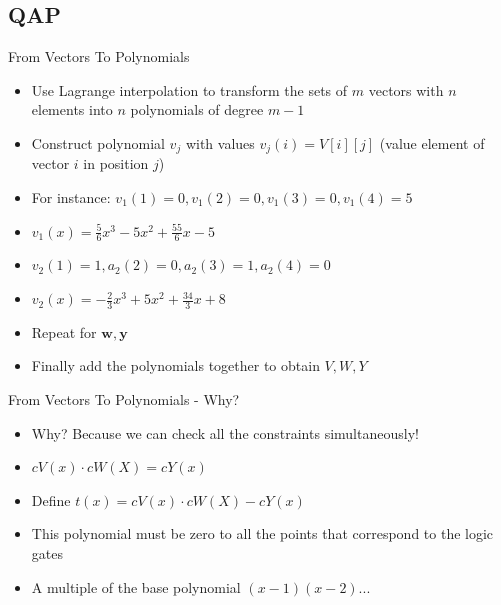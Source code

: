 \documentclass[handouts]{beamer}
\begin{document}
\subsection{QAP}
\begin{frame}{From Vectors To Polynomials}
    \begin{itemize}
        \item Use Lagrange interpolation to transform the sets of $m$ vectors with $n$ elements into $n$ polynomials of degree $m-1$ \pause
        \item Construct polynomial $v_j$ with values $v_j(i) =V[i][j]$ (value element of vector $i$ in position $j$) \pause
        \item For instance: $v_1(1) = 0, v_1(2) = 0, v_1(3)=0, v_1(4) = 5$ \pause
        \item $v_1(x) = \frac{5}{6}x^3-5x^2+\frac{55}{6}x-5$ \pause
        \item $v_2(1) = 1, a_2(2) = 0, a_2(3)=1, a_2(4) = 0$ \pause
        \item $v_2(x) = -\frac{2}{3}x^3+5x^2+\frac{34}{3}x+8$ \pause
        \item Repeat for $\bm{w}, \bm{y}$ \pause
        \item Finally add the polynomials together to obtain $V,W,Y$ \pause
    \end{itemize}
\end{frame}

\begin{frame}{From Vectors To Polynomials - Why?}
\begin{itemize}
    \item Why? Because we can check all the constraints simultaneously! \pause
    \item $cV(x) \cdot cW(X) = cY(x)$ \pause
    \item Define $t(x) = cV(x) \cdot cW(X) - cY(x)$ \pause
    \item This polynomial must be zero to all the points that correspond to the logic gates \pause
    \item A multiple of the base polynomial $(x-1)(x-2)...$
\end{itemize}
\end{frame}
\end{document}
